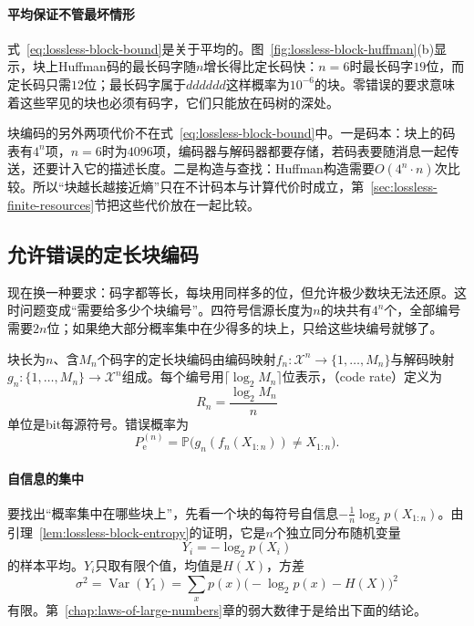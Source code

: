\paragraph{平均保证不管最坏情形}
式~\eqref{eq:lossless-block-bound}是关于平均的。图~\ref{fig:lossless-block-huffman}(b)显示，块上Huffman码的最长码字随$n$增长得比定长码快：$n=6$时最长码字$19$位，而定长码只需$12$位；最长码字属于$dddddd$这样概率为$10^{-6}$的块。零错误的要求意味着这些罕见的块也必须有码字，它们只能放在码树的深处。

块编码的另外两项代价不在式~\eqref{eq:lossless-block-bound}中。一是码本：块上的码表有$4^n$项，$n=6$时为$4096$项，编码器与解码器都要存储，若码表要随消息一起传送，还要计入它的描述长度。二是构造与查找：Huffman构造需要$O(4^n\cdot n)$次比较。所以“块越长越接近熵”只在不计码本与计算代价时成立，第~\ref{sec:lossless-finite-resources}节把这些代价放在一起比较。

\subsection{允许错误的定长块编码}
\label{sec:lossless-fixed-block}

现在换一种要求：码字都等长，每块用同样多的位，但允许极少数块无法还原。这时问题变成“需要给多少个块编号”。四符号信源长度为$n$的块共有$4^n$个，全部编号需要$2n$位；如果绝大部分概率集中在少得多的块上，只给这些块编号就够了。

\begin{definition}[定长块编码与码率]
\label{def:lossless-fixed-length}
块长为$n$、含$M_n$个码字的定长块编码由编码映射$f_n:\mathcal{X}^n\to\{1,\dots,M_n\}$与解码映射$g_n:\{1,\dots,M_n\}\to\mathcal{X}^n$组成。每个编号用$\lceil\log_2M_n\rceil$位表示，（code rate）定义为
\begin{equation}
 R_n=\frac{\log_2M_n}{n}
 \label{eq:lossless-rate}
\end{equation}
单位是bit每源符号。错误概率为
\begin{equation}
 P_{\mathrm{e}}^{(n)}=\mathbb{P}\bigl(g_n(f_n(X_{1:n}))\neq X_{1:n}\bigr).
 \label{eq:lossless-error-prob}
\end{equation}
\end{definition}

\paragraph{自信息的集中}
要找出“概率集中在哪些块上”，先看一个块的每符号自信息$-\frac1n\log_2p(X_{1:n})$。由引理~\ref{lem:lossless-block-entropy}的证明，它是$n$个独立同分布随机变量
\[
 Y_i=-\log_2p(X_i)
\]
的样本平均。$Y_i$只取有限个值，均值是$H(X)$，方差
\[
 \sigma^2=\operatorname{Var}(Y_1)=\sum_xp(x)\bigl(-\log_2p(x)-H(X)\bigr)^2
\]
有限。第~\ref{chap:laws-of-large-numbers}章的弱大数律于是给出下面的结论。

